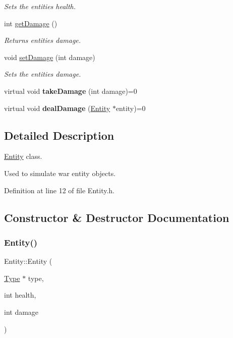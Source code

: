 \begin{DoxyCompactItemize}
\begin{DoxyCompactList}\small\item\em Sets the entities health. \end{DoxyCompactList}\item 
int \hyperlink{classEntity_ad38d4384aa0adef43443666a33f06508}{get\+Damage} ()
\begin{DoxyCompactList}\small\item\em Returns entities damage. \end{DoxyCompactList}\item 
void \hyperlink{classEntity_aae05f62767eb7438c846300704f9579b}{set\+Damage} (int damage)
\begin{DoxyCompactList}\small\item\em Sets the entities damage. \end{DoxyCompactList}\item 
\mbox{\label{classEntity_a9cc5a2246a5580ceed0f081c18211e53}} 
virtual void {\bfseries take\+Damage} (int damage)=0
\item 
\mbox{\label{classEntity_aff881f545fc88b2c328ff559a99c7fba}} 
virtual void {\bfseries deal\+Damage} (\hyperlink{classEntity}{Entity} $\ast$entity)=0
\end{DoxyCompactItemize}


\subsection{Detailed Description}
\hyperlink{classEntity}{Entity} class. 

Used to simulate war entity objects. 

Definition at line 12 of file Entity.\+h.



\subsection{Constructor \& Destructor Documentation}
\mbox{\label{classEntity_a68e832f69650ee80b83228a038eb66f0}} 
\subsubsection{\texorpdfstring{Entity()}{Entity()}}
{\footnotesize\ttfamily Entity\+::\+Entity (\begin{DoxyParamCaption}\item[{\hyperlink{classType}{Type} $\ast$}]{type,  }\item[{int}]{health,  }\item[{int}]{damage }\end{DoxyParamCaption})}



